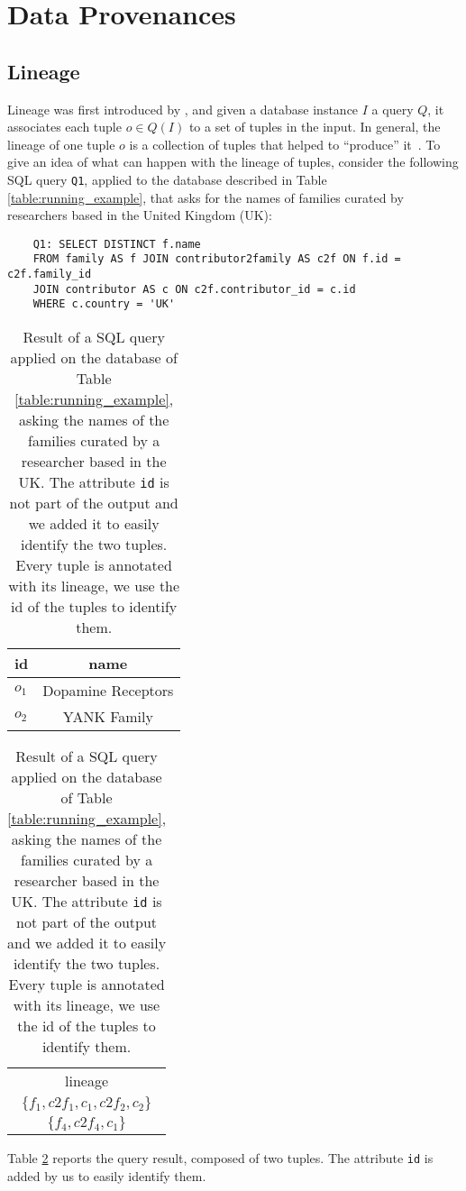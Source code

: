 \section{Data Provenances}
\label{section:preliminaries}

\subsection{Lineage}
Lineage was first introduced by \cite{lineageCui}, and given a database instance $I$ a query $Q$, it associates each tuple $o \in Q(I)$ to a set of tuples in the input.
In general, the lineage of one tuple $o$ is a collection of tuples that helped to ``produce'' it~\citep{CheneyProvSurvey}.
To give an idea of what can happen with the lineage of tuples, consider the following SQL query \texttt{Q1}, applied to the database described in Table \ref{table:running_example}, that asks for the names of families curated by researchers based in the United Kingdom (UK):

\begin{verbatim}
	Q1: SELECT DISTINCT f.name
	FROM family AS f JOIN contributor2family AS c2f ON f.id = c2f.family_id
	JOIN contributor AS c ON c2f.contributor_id = c.id
	WHERE c.country = 'UK'
\end{verbatim}

\begin{table}[hbt]
\centering
  \begin{tabular}{|l|c|}
  \hline
    id & name\\
    \hline
    $o_1$ &  Dopamine Receptors\\
    $o_2$ & YANK Family\\
    \hline
  \end{tabular}
  \begin{tabular}{c}
  	lineage   \\
  	$\{f_1, c2f_1, c_1, c2f_2, c_2\}$ \\
  	$\{ f_4, c2f_4, c_1\}$ \\
  \end{tabular}
    \caption{Result of a SQL query applied on the database of Table \ref{table:running_example}, asking the names of the families curated by a researcher based in the UK. The attribute \texttt{id} is not part of the output and we added it to easily identify the two tuples. Every tuple is annotated with its lineage, we use the id of the tuples to identify them.}
  \label{table:result}
\end{table}

Table \ref{table:result} reports the query result, composed of two tuples. The attribute \texttt{id} is added by us to easily identify them.

